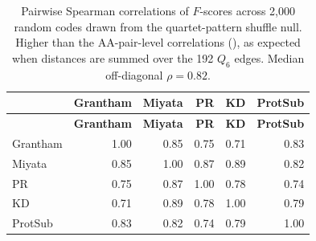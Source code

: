 \documentclass[preprint,11pt,authoryear,a4paper]{elsarticle}
\begin{document}
\protect{}\label{tbl:s-metric-corr-pairs}{}

\begin{longtable}[]{@{}lrrrrr@{}}
\caption{Pairwise Spearman correlations of \(F\)-scores across 2,000
random codes drawn from the quartet-pattern shuffle null. Higher than
the AA-pair-level correlations (), as
expected when distances are summed over the 192 \(Q_{6}\) edges. Median
off-diagonal \(\rho = 0.82\).}\tabularnewline
\toprule\noalign{}
& \textbf{Grantham} & \textbf{Miyata} & \textbf{PR} & \textbf{KD} &
\textbf{ProtSub} \\
\midrule\noalign{}
\endfirsthead
\toprule\noalign{}
& \textbf{Grantham} & \textbf{Miyata} & \textbf{PR} & \textbf{KD} &
\textbf{ProtSub} \\
\midrule\noalign{}
\endhead
\bottomrule\noalign{}
\endlastfoot
Grantham & 1.00 & 0.85 & 0.75 & 0.71 & 0.83 \\
Miyata & 0.85 & 1.00 & 0.87 & 0.89 & 0.82 \\
PR & 0.75 & 0.87 & 1.00 & 0.78 & 0.74 \\
KD & 0.71 & 0.89 & 0.78 & 1.00 & 0.79 \\
ProtSub & 0.83 & 0.82 & 0.74 & 0.79 & 1.00 \\
\end{longtable}

\protect{}\label{tbl:s-metric-corr-codes}{}
\end{document}
